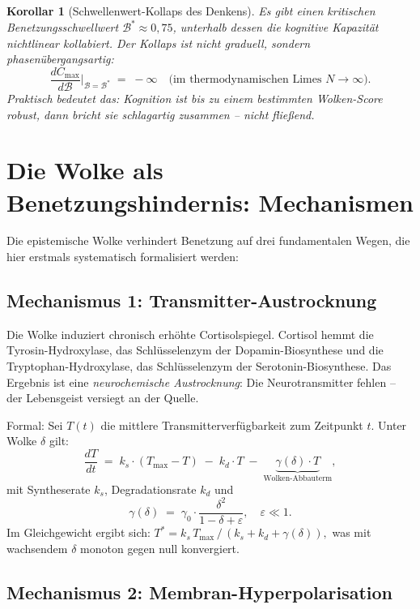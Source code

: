 ﻿\documentclass[12pt,a4paper]{report}
\theoremstyle{plain}
\newtheorem{korollar}[theorem]{Korollar}
\theoremstyle{definition}
\theoremstyle{remark}
\begin{document}
	\begin{korollar}[Schwellenwert-Kollaps des Denkens]
		\label{kor:kollaps}
		Es gibt einen kritischen Benetzungsschwellwert
		$\mathcal{B}^* \approx 0{,}75$, unterhalb dessen die kognitive
		Kapazität nichtlinear kollabiert. Der Kollaps ist nicht graduell,
		sondern phasenübergangsartig:
		\[
		\frac{dC_{\max}}{d\mathcal{B}}\bigg|_{\mathcal{B}=\mathcal{B}^*}
		\;=\; -\infty
		\quad\text{(im thermodynamischen Limes } N \to \infty\text{)}.
		\]
		Praktisch bedeutet das: Kognition ist bis zu einem bestimmten
		Wolken-Score robust, dann bricht sie schlagartig zusammen --
		nicht fließend.
	\end{korollar}

	\section{Die Wolke als Benetzungshindernis: Mechanismen}

	Die epistemische Wolke verhindert Benetzung auf drei fundamentalen
	Wegen, die hier erstmals systematisch formalisiert werden:

	\subsection{Mechanismus 1: Transmitter-Austrocknung}

	Die Wolke induziert chronisch erhöhte Cortisolspiegel.
	Cortisol hemmt die Tyrosin-Hydro\-xylase, das Schlüsselenzym der
	Dopamin-Biosynthese und die Tryptophan-Hydroxylase, das Schlüsselenzym der Serotonin-Biosynthese.
	Das Ergebnis ist eine \emph{neurochemische Austrocknung}:
	Die Neurotransmitter fehlen -- der Lebensgeist versiegt an der Quelle.

	Formal: Sei $T(t)$ die mittlere Transmitterverfügbarkeit zum
	Zeitpunkt $t$. Unter Wolke $\delta$ gilt:
	\[
	\frac{dT}{dt} \;=\; k_s \cdot (T_{\max} - T)
	\;-\; k_d \cdot T
	\;-\; \underbrace{\gamma(\delta) \cdot T}_{\text{Wolken-Abbauterm}},
	\]
	mit Syntheserate $k_s$, Degradationsrate $k_d$ und
	\[
	\gamma(\delta) \;=\; \gamma_0 \cdot \frac{\delta^2}{1-\delta+\varepsilon},
	\quad \varepsilon \ll 1.
	\]
	Im Gleichgewicht ergibt sich:
	$T^* = k_s\,T_{\max}\,/\,(k_s + k_d + \gamma(\delta)),$
	was mit wachsendem $\delta$ monoton gegen null konvergiert.

	\subsection{Mechanismus 2: Membran-Hyperpolarisation}
\end{document}
